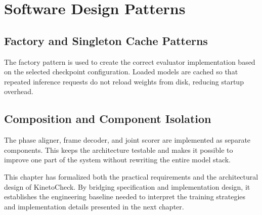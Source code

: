 \section{Software Design Patterns}

\subsection{Factory and Singleton Cache Patterns}
The factory pattern is used to create the correct evaluator implementation based on the selected checkpoint configuration. Loaded models are cached so that repeated inference requests do not reload weights from disk, reducing startup overhead.

\subsection{Composition and Component Isolation}
The phase aligner, frame decoder, and joint scorer are implemented as separate components. This keeps the architecture testable and makes it possible to improve one part of the system without rewriting the entire model stack.

This chapter has formalized both the practical requirements and the architectural design of KinetoCheck. By bridging specification and implementation design, it establishes the engineering baseline needed to interpret the training strategies and implementation details presented in the next chapter.